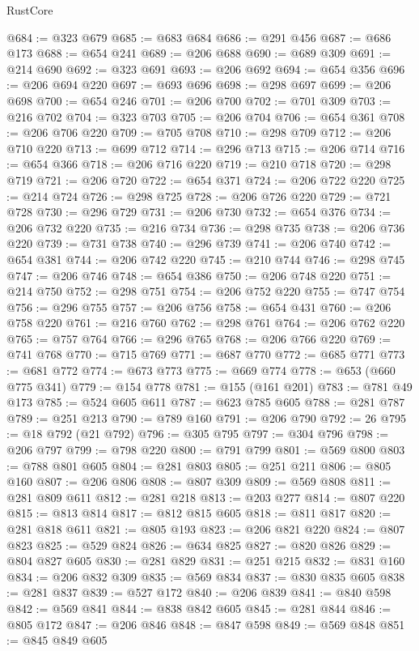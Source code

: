 \begin{lexlean}{RustCore}
\begin{coremodule}
@684 := @323 @679
@685 := @683 @684
@686 := @291 @456
@687 := @686 @173
@688 := @654 @241
@689 := @206 @688
@690 := @689 @309
@691 := @214 @690
@692 := @323 @691
@693 := @206 @692
@694 := @654 @356
@696 := @206 @694 @220
@697 := @693 @696
@698 := @298 @697
@699 := @206 @698
@700 := @654 @246
@701 := @206 @700
@702 := @701 @309
@703 := @216 @702
@704 := @323 @703
@705 := @206 @704
@706 := @654 @361
@708 := @206 @706 @220
@709 := @705 @708
@710 := @298 @709
@712 := @206 @710 @220
@713 := @699 @712
@714 := @296 @713
@715 := @206 @714
@716 := @654 @366
@718 := @206 @716 @220
@719 := @210 @718
@720 := @298 @719
@721 := @206 @720
@722 := @654 @371
@724 := @206 @722 @220
@725 := @214 @724
@726 := @298 @725
@728 := @206 @726 @220
@729 := @721 @728
@730 := @296 @729
@731 := @206 @730
@732 := @654 @376
@734 := @206 @732 @220
@735 := @216 @734
@736 := @298 @735
@738 := @206 @736 @220
@739 := @731 @738
@740 := @296 @739
@741 := @206 @740
@742 := @654 @381
@744 := @206 @742 @220
@745 := @210 @744
@746 := @298 @745
@747 := @206 @746
@748 := @654 @386
@750 := @206 @748 @220
@751 := @214 @750
@752 := @298 @751
@754 := @206 @752 @220
@755 := @747 @754
@756 := @296 @755
@757 := @206 @756
@758 := @654 @431
@760 := @206 @758 @220
@761 := @216 @760
@762 := @298 @761
@764 := @206 @762 @220
@765 := @757 @764
@766 := @296 @765
@768 := @206 @766 @220
@769 := @741 @768
@770 := @715 @769
@771 := @687 @770
@772 := @685 @771
@773 := @681 @772
@774 := @673 @773
@775 := @669 @774
@778 := @653 (@660 @775 @341)
@779 := @154 @778
@781 := @155 (@161 @201)
@783 := @781 @49 @173
@785 := @524 @605 @611
@787 := @623 @785 @605
@788 := @281 @787
@789 := @251 @213
@790 := @789 @160
@791 := @206 @790
@792 := 26
@795 := @18 @792 (@21 @792)
@796 := @305 @795
@797 := @304 @796
@798 := @206 @797
@799 := @798 @220
@800 := @791 @799
@801 := @569 @800
@803 := @788 @801 @605
@804 := @281 @803
@805 := @251 @211
@806 := @805 @160
@807 := @206 @806
@808 := @807 @309
@809 := @569 @808
@811 := @281 @809 @611
@812 := @281 @218
@813 := @203 @277
@814 := @807 @220
@815 := @813 @814
@817 := @812 @815 @605
@818 := @811 @817
@820 := @281 @818 @611
@821 := @805 @193
@823 := @206 @821 @220
@824 := @807 @823
@825 := @529 @824
@826 := @634 @825
@827 := @820 @826
@829 := @804 @827 @605
@830 := @281 @829
@831 := @251 @215
@832 := @831 @160
@834 := @206 @832 @309
@835 := @569 @834
@837 := @830 @835 @605
@838 := @281 @837
@839 := @527 @172
@840 := @206 @839
@841 := @840 @598
@842 := @569 @841
@844 := @838 @842 @605
@845 := @281 @844
@846 := @805 @172
@847 := @206 @846
@848 := @847 @598
@849 := @569 @848
@851 := @845 @849 @605

\end{coremodule}
\end{lexlean}
